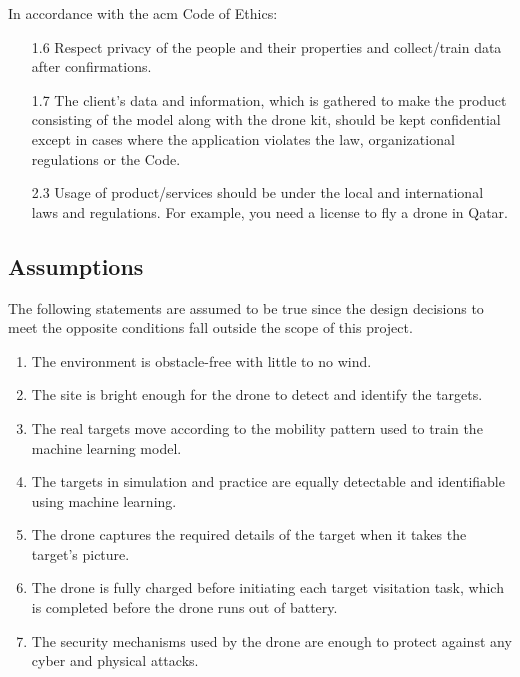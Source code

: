 \documentclass[../main.tex]{subfiles}
\begin{document}
\noindent
In accordance with the \gls{acm} Code of Ethics:
\begin{itemize}
    \item[1.6] Respect privacy of the people and their 
        properties and collect/train data after confirmations.
    \item[1.7] The client's data and information, which is gathered 
        to make the product consisting of the model along with 
        the drone kit, should be kept confidential except in cases 
        where the application violates the law, 
        organizational regulations or the Code.
    \item[2.3] Usage of product/services should be under 
        the local and international laws and regulations. 
        For example, you need a license to fly a drone in Qatar.
\end{itemize}

\subsection{Assumptions}

The following statements are assumed to be true
since the design decisions to meet the opposite
conditions fall outside the scope of this project.

\begin{enumerate}
    \item The environment is obstacle-free with little 
        to no wind.
    \item The site is bright enough for the drone to
        detect and identify the targets.
    \item The real targets move according to the mobility 
        pattern used to train the machine learning model.
    \item The targets in simulation and practice are 
        equally detectable and identifiable using 
        machine learning.
    \item The \anafi drone captures the 
        required details of the target 
        when it takes the target’s picture.
    \item The \anafi drone is fully charged before 
        initiating each target visitation task,
        which is completed before the drone
        runs out of battery.
    \item The security mechanisms used by the \anafi
        drone are enough to protect against
        any cyber and physical attacks.
\end{enumerate}
\end{document}
